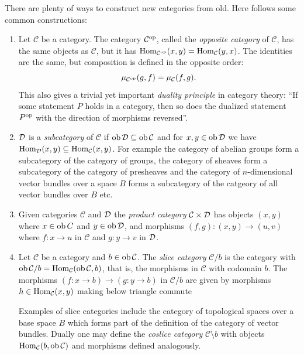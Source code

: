 \documentclass[a4paper,openany]{scrbook}
\renewcommand{\C}{\mathcal C}
\begin{document}
\begin{example}
There are plenty of ways to construct new categories from old. Here follows some common constructions:
\begin{enumerate}[label=\alph*)]
\item Let $\C$ be a category. The category $\C^\op$, called the \emph{opposite category} of $\C$, has the same objects as $\C$, but it has $\Hom_{\C^\op}(x,y) = \Hom_\C(y,x)$. The identities are the same, but composition is defined in the opposite order:
\[
\mu_{\C^\op}(g,f) = \mu_\C(f,g).
\]
This also gives a trivial yet important \emph{duality principle} in category theory:
``If some statement $P$ holds in a category, then so does the dualized statement $P^{{\operatorname{op}}}$ with the direction of morphisms reversed''.
\item $\mathcal D$ is a \emph{subcategory} of $\C$ if $\ob \D \subseteq \ob \C$ and for $x,y \in \operatorname{ob} \mathcal D$ we have $\Hom_{\D}(x,y) \subseteq \Hom_{\C}(x,y)$. For example the category of abelian groups form a subcategory of the category of groups, the category of sheaves form a subcategory of the category of presheaves and the category of $n$-dimensional vector bundles over a space $B$ forms a subcategory of the catgeory of all vector bundles over $B$ etc. 
\item Given categories $\C$ and $\mathcal D$ the \emph{product category} $\C \times \D$ has objects $(x,y)$ where $x \in \operatorname{ob} C$ and $y \in \operatorname{ob} \mathcal D$, and morphisms $(f,g):(x,y) \to (u,v)$ where $f:x \to u$ in $\C$ and $g:y \to v$ in $\mathcal D$.
\item Let $\C$ be a category and $b \in \ob \C$. The \emph{slice category} $\C / b$ is the category with $\ob \C/b = \Hom_{\C}(\ob \C, b)$, that is, the morphisms in $\C$ with codomain $b$. The morphisms $(f:x \to b) \to (g:y \to b)$ in $\C/b$ are given by morphisms $h \in \Hom_{\C}(x,y)$ making below triangle commute
\begin{center}
\end{center} \noindent
Examples of slice categories include the category of topological spaces over a base space $B$ which forms part of the definition of the category of vector bundles. Dually one may define the \emph{coslice category} $\C \setminus b$ with objects $\Hom_{\C}(b, \ob \C)$ and morphisms defined analogously. 
\end{enumerate}
\end{example}
\end{document}
